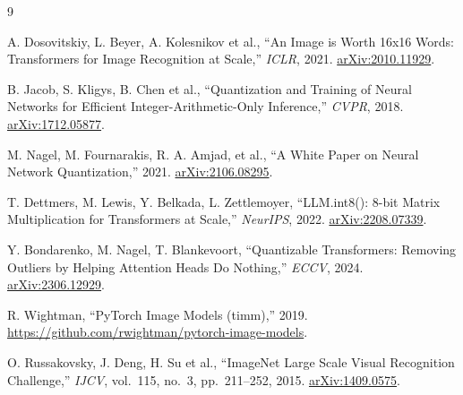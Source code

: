 \documentclass[12pt,a4paper]{article}
\begin{document}
\begin{thebibliography}{9}

A. Dosovitskiy, L. Beyer, A. Kolesnikov et al.,
``An Image is Worth 16x16 Words: Transformers for Image Recognition at Scale,''
\emph{ICLR}, 2021. \href{https://arxiv.org/abs/2010.11929}{arXiv:2010.11929}.

B. Jacob, S. Kligys, B. Chen et al.,
``Quantization and Training of Neural Networks for Efficient
Integer-Arithmetic-Only Inference,''
\emph{CVPR}, 2018. \href{https://arxiv.org/abs/1712.05877}{arXiv:1712.05877}.

M. Nagel, M. Fournarakis, R. A. Amjad, et al.,
``A White Paper on Neural Network Quantization,''
2021. \href{https://arxiv.org/abs/2106.08295}{arXiv:2106.08295}.

T. Dettmers, M. Lewis, Y. Belkada, L. Zettlemoyer,
``LLM.int8(): 8-bit Matrix Multiplication for Transformers at Scale,''
\emph{NeurIPS}, 2022. \href{https://arxiv.org/abs/2208.07339}{arXiv:2208.07339}.

Y. Bondarenko, M. Nagel, T. Blankevoort,
``Quantizable Transformers: Removing Outliers by Helping Attention Heads
Do Nothing,''
\emph{ECCV}, 2024. \href{https://arxiv.org/abs/2306.12929}{arXiv:2306.12929}.

R. Wightman, ``PyTorch Image Models (timm),'' 2019.
\url{https://github.com/rwightman/pytorch-image-models}.

O. Russakovsky, J. Deng, H. Su et al.,
``ImageNet Large Scale Visual Recognition Challenge,''
\emph{IJCV}, vol.~115, no.~3, pp.~211--252, 2015.
\href{https://arxiv.org/abs/1409.0575}{arXiv:1409.0575}.

\end{thebibliography}
\end{document}
